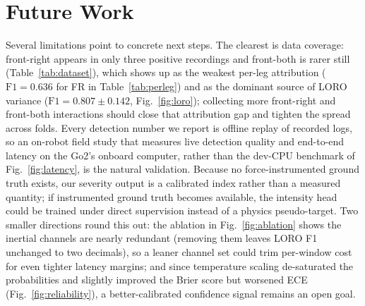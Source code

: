 \section{Future Work}

Several limitations point to concrete next steps. The clearest is data coverage: front-right appears in only three positive recordings and front-both is rarer still (Table~\ref{tab:dataset}), which shows up as the weakest per-leg attribution ($\mathrm{F1}=0.636$ for FR in Table~\ref{tab:perleg}) and as the dominant source of LORO variance ($\mathrm{F1}=0.807\pm0.142$, Fig.~\ref{fig:loro}); collecting more front-right and front-both interactions should close that attribution gap and tighten the spread across folds. Every detection number we report is offline replay of recorded logs, so an on-robot field study that measures live detection quality and end-to-end latency on the Go2's onboard computer, rather than the dev-CPU benchmark of Fig.~\ref{fig:latency}, is the natural validation. Because no force-instrumented ground truth exists, our severity output is a calibrated index rather than a measured quantity; if instrumented ground truth becomes available, the intensity head could be trained under direct supervision instead of a physics pseudo-target. Two smaller directions round this out: the ablation in Fig.~\ref{fig:ablation} shows the inertial channels are nearly redundant (removing them leaves LORO F1 unchanged to two decimals), so a leaner channel set could trim per-window cost for even tighter latency margins; and since temperature scaling de-saturated the probabilities and slightly improved the Brier score but worsened ECE (Fig.~\ref{fig:reliability}), a better-calibrated confidence signal remains an open goal.
